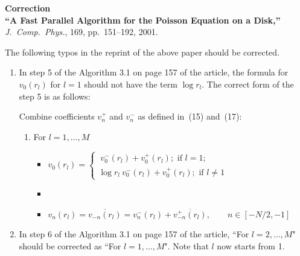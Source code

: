 \documentclass[12pt]{article}
\begin{document}
\begin{center}
{\bf Correction}\\
{\bf ``A Fast Parallel Algorithm for the Poisson Equation on a Disk,''}
{\it J.\ Comp.\ Phys.\/}, 169, pp.~151--192, 2001.
\end{center}

The following typos in the reprint of the above paper should be corrected.
\begin{enumerate}
\item
In step 5 of the Algorithm 3.1 on page 157 of the article, the formula for 
$v_0(r_l)$ for $l=1$ should not have the term $\log r_l$. The correct form of the
step 5 is as follows:

Combine coefficients $v_n^{+}$ and $v_n^{-}$ as defined in~(15) and~(17):
   \begin{enumerate}
   \item[] For $l=1,\dots,M$
      \begin{itemize}
      \item[] $v_0(r_l) = \left\{\begin{array}{l}\ v_0^{-}(r_l) +v_0^{+}(r_l); \text{ if } l=1;\\ \log r_l\ v_0^{-}(r_l) +v_0^{+}(r_l); \text{ if } l \ne 1\end{array}\right.$
      \item[]
      \item[] $v_n(r_l) = \overline{v_{-n}(r_l)} = 
              v_n^{-}(r_l) + \overline{v_{-n}^{+}(r_l)},\qquad n\in[-N/2,-1]$
      \end{itemize}
   \end{enumerate}

\item
In step 6 of the Algorithm 3.1 on page 157 of the article, ``For $l=2,\ldots, M$"
should be corrected as ``For $l=1,\ldots, M$". Note that $l$ now starts from 1.

\end{enumerate}
\end{document}
